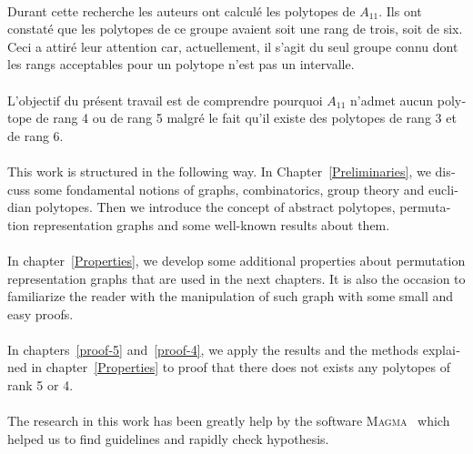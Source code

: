 \begin{otherlanguage}{french}
\paragraph{}
Durant cette recherche les auteurs ont calculé les polytopes de $A_{11}$. Ils ont constaté que les polytopes de ce groupe avaient soit une rang de trois, soit de six. Ceci a attiré leur attention car, actuellement, il s'agit du seul groupe connu dont les rangs acceptables pour un polytope n'est pas un intervalle.

\paragraph{}
L'objectif du présent travail est de comprendre pourquoi $A_{11}$ n'admet aucun polytope de rang 4 ou de rang 5 malgré le fait qu'il existe des polytopes de rang 3 et de rang 6.

\paragraph{}
This work is structured in the following way. In Chapter~\ref{Preliminaries}, we discuss some fondamental notions of graphs, combinatorics, group theory and euclidian polytopes. Then we introduce the concept of abstract polytopes, permutation representation graphs and some well-known results about them.

\paragraph{}
In chapter~\ref{Properties}, we develop some additional properties about permutation representation graphs that are used in the next chapters. It is also the occasion to familiarize the reader with the manipulation of such graph with some small and easy proofs.

\paragraph{}
In chapters~\ref{proof-5} and~\ref{proof-4}, we apply the results and the methods explained in chapter~\ref{Properties} to proof that there does not exists any polytopes of rank 5 or 4.

\paragraph{}
The research in this work has been greatly help by the software \textsc{Magma}~\cite{magma} which helped us to find guidelines and rapidly check hypothesis.


\end{otherlanguage}
